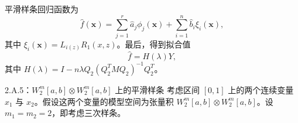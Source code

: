 平滑样条回归函数为
\begin{equation}
\widehat f(\boldsymbol x)=\sum_{j=1}^r\widehat a_j\phi_j(\boldsymbol x)
 +\sum_{i=1}^n\widehat b_i\xi_i(\boldsymbol x),\tag{2.A.105}
\end{equation}
其中 $\xi_i(\boldsymbol x)=L_{i(z)}R_1(x,z)$。最后，得到拟合值
\begin{equation}
\widehat f=H(\lambda)Y,\tag{2.A.106}
\end{equation}
其中 $H(\lambda)=I-n\lambda Q_2(Q_2^TMQ_2)^{-1}Q_2^T$。

\begin{bookexample}{2.A.5：$W_2^m[a,b]\otimes W_2^m[a,b]$ 上的平滑样条}
考虑区间 $[0,1]$ 上的两个连续变量 $x_1$ 与 $x_2$。假设这两个变量的模型空间为张量积 $W_2^m[a,b]\otimes W_2^m[a,b]$。设 $m_1=m_2=2$，即考虑三次样条。


\end{bookexample}
